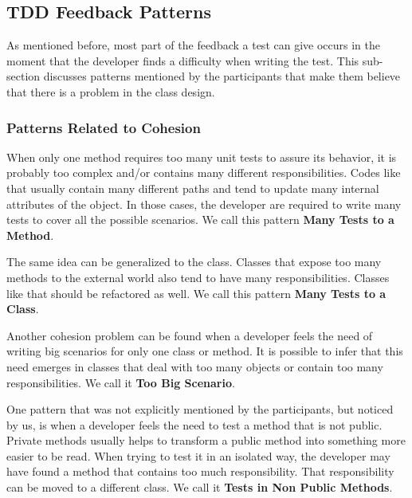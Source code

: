 \documentclass[conference]{IEEEtran}
\begin{document}
\subsection{TDD Feedback Patterns}
\label{padroes-tdd}

As mentioned before, most part of the feedback a test can give occurs in the moment
that the developer finds a difficulty when writing the test. This sub-section discusses
patterns mentioned by the participants that make them believe that there is a
problem in the class design.

\subsubsection{Patterns Related to Cohesion}

When only one method requires too many unit tests to assure its behavior,
it is probably too complex and/or contains many different responsibilities.
Codes like that usually contain many different paths and tend to update
many internal attributes of the object. In those cases, the developer
are required to write many tests to cover all the possible scenarios.
We call this pattern \textbf{Many Tests to a Method}.

The same idea can be generalized to the class. Classes that expose too 
many methods to the external world also tend to have many responsibilities.
Classes like that should be refactored as well.
We call this pattern \textbf{Many Tests to a Class}.

Another cohesion problem can be found when a developer feels the need
of writing big scenarios for only one class or method. It is possible to infer
that this need emerges in classes that deal with too many objects or
contain too many responsibilities. We call it \textbf{Too Big Scenario}.

One pattern that was not explicitly mentioned by the participants, but
noticed by us, is when a developer feels the need to test a method
that is not public. Private methods usually helps to transform a public method
into something more easier to be read. When trying to test it in an isolated
way, the developer may have found a method that contains too much responsibility.
That responsibility can be moved to a different class. We call it \textbf{Tests in Non Public Methods}.

\end{document}
